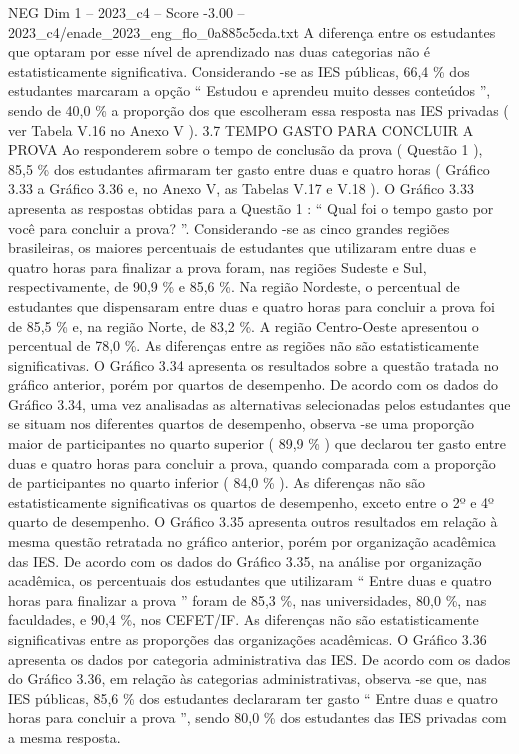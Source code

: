 \begin{textsample}{NEG Dim 1 – 2023\_c4 – Score -3.00 – 2023\_c4/enade\_2023\_eng\_flo\_0a885c5cda.txt}
A diferença entre os estudantes que optaram por esse nível de aprendizado nas duas categorias não é estatisticamente significativa.
Considerando -se as IES públicas, 66,4 \% dos estudantes marcaram a opção “ Estudou e aprendeu muito desses conteúdos ”, sendo de 40,0 \% a proporção dos que escolheram essa resposta nas IES privadas ( ver Tabela V.16 no Anexo V ). 3.7 TEMPO GASTO PARA CONCLUIR A PROVA Ao responderem sobre o tempo de conclusão da prova ( Questão 1 ), 85,5 \% dos estudantes afirmaram ter gasto entre duas e quatro horas ( Gráfico 3.33 a Gráfico 3.36 e, no Anexo V, as Tabelas V.17 e V.18 ).
O Gráfico 3.33 apresenta as respostas obtidas para a Questão 1 : “ Qual foi o tempo gasto por você para concluir a prova? ”.
Considerando -se as cinco grandes regiões brasileiras, os maiores percentuais de estudantes que utilizaram entre duas e quatro horas para finalizar a prova foram, nas regiões Sudeste e Sul, respectivamente, de 90,9 \% e 85,6 \%.
Na região Nordeste, o percentual de estudantes que dispensaram entre duas e quatro horas para concluir a prova foi de 85,5 \% e, na região Norte, de 83,2 \%.
A região Centro-Oeste apresentou o percentual de 78,0 \%.
As diferenças entre as regiões não são estatisticamente significativas.
O Gráfico 3.34 apresenta os resultados sobre a questão tratada no gráfico anterior, porém por quartos de desempenho.
De acordo com os dados do Gráfico 3.34, uma vez analisadas as alternativas selecionadas pelos estudantes que se situam nos diferentes quartos de desempenho, observa -se uma proporção maior de participantes no quarto superior ( 89,9 \% ) que declarou ter gasto entre duas e quatro horas para concluir a prova, quando comparada com a proporção de participantes no quarto inferior ( 84,0 \% ).
As diferenças não são estatisticamente significativas os quartos de desempenho, exceto entre o 2º e 4º quarto de desempenho.
O Gráfico 3.35 apresenta outros resultados em relação à mesma questão retratada no gráfico anterior, porém por organização acadêmica das IES.
De acordo com os dados do Gráfico 3.35, na análise por organização acadêmica, os percentuais dos estudantes que utilizaram “ Entre duas e quatro horas para finalizar a prova ” foram de 85,3 \%, nas universidades, 80,0 \%, nas faculdades, e 90,4 \%, nos CEFET/IF.
As diferenças não são estatisticamente significativas entre as proporções das organizações acadêmicas.
O Gráfico 3.36 apresenta os dados por categoria administrativa das IES.
De acordo com os dados do Gráfico 3.36, em relação às categorias administrativas, observa -se que, nas IES públicas, 85,6 \% dos estudantes declararam ter gasto “ Entre duas e quatro horas para concluir a prova ”, sendo 80,0 \% dos estudantes das IES privadas com a mesma resposta.

\end{textsample}
